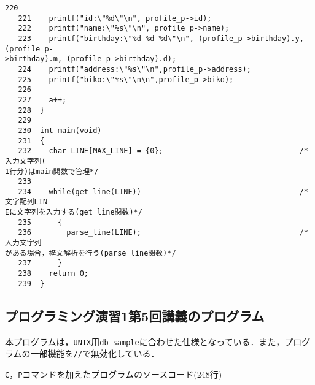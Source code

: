 \begin{Verbatim}[fontsize=\small, baselinestretch=0.8]
   220	
   221	  printf("id:\"%d\"\n", profile_p->id);
   222	  printf("name:\"%s\"\n", profile_p->name);
   223	  printf("birthday:\"%d-%d-%d\"\n", (profile_p->birthday).y, (profile_p-
>birthday).m, (profile_p->birthday).d);
   224	  printf("address:\"%s\"\n",profile_p->address);
   225	  printf("biko:\"%s\"\n\n",profile_p->biko);
   226	
   227	  a++;
   228	}
   229	
   230	int main(void)
   231	{
   232	  char LINE[MAX_LINE] = {0};                               /*入力文字列(
1行分)はmain関数で管理*/
   233	
   234	  while(get_line(LINE))                                    /*文字配列LIN
Eに文字列を入力する(get_line関数)*/
   235	    {
   236	      parse_line(LINE);                                    /*入力文字列
がある場合，構文解析を行う(parse_line関数)*/
   237	    }
   238	  return 0;
   239	}
\end{Verbatim}

\subsection{プログラミング演習1第5回講義のプログラム}\label{func5}

本プログラムは，\verb|UNIX|用\verb|db-sample|に合わせた仕様となっている．また，プログラムの一部機能を\verb|//|で無効化している．

\verb|C|，\verb|P|コマンドを加えたプログラムのソースコード(248行)

